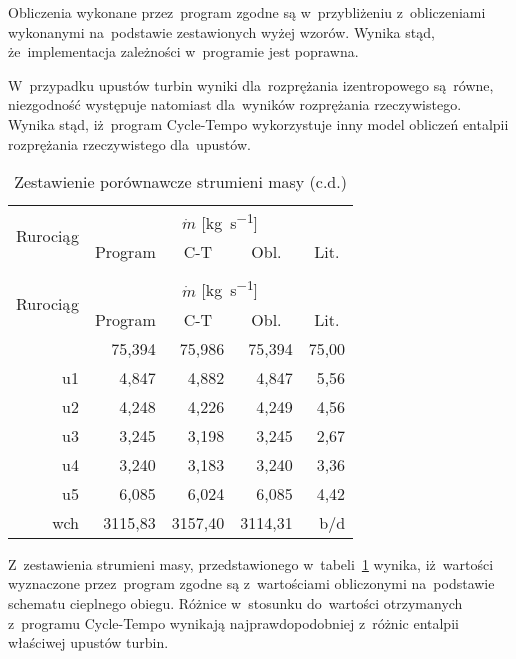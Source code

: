 Obliczenia wykonane przez~program zgodne są w~przybliżeniu
z~obliczeniami wykonanymi na~podstawie zestawionych wyżej wzorów.
Wynika stąd, że~implementacja zależności w~programie jest poprawna.

W~przypadku upustów turbin wyniki dla~rozprężania izentropowego
są~równe, niezgodność występuje natomiast dla~wyników rozprężania
rzeczywistego. Wynika stąd, iż~program Cycle-Tempo wykorzystuje inny
model obliczeń entalpii rozprężania rzeczywistego dla~upustów.

\begin{longtable}{|*{5}{r|}}
	\caption{Zestawienie porównawcze strumieni masy}
	\label{test-wyniki3} \\

	\hline
		\multirow{2}{*}{Rurociąg} &
		\multicolumn{4}{c|}{$\dot m$ [\si{\kilogram\per\second}]} \\
	\cline{2-5}
		&
		\multicolumn{1}{c|}{Program} &
		\multicolumn{1}{c|}{C-T} &
		\multicolumn{1}{c|}{Obl.} &
		\multicolumn{1}{c|}{Lit.} \\
	\hline
	\endfirsthead
	\caption{Zestawienie porównawcze strumieni masy (c.d.)} \\

	\hline
		\multirow{2}{*}{Rurociąg} &
		\multicolumn{4}{c|}{$\dot m$ [\si{\kilogram\per\second}]} \\
	\cline{2-5}
		&
		\multicolumn{1}{c|}{Program} &
		\multicolumn{1}{c|}{C-T} &
		\multicolumn{1}{c|}{Obl.} &
		\multicolumn{1}{c|}{Lit.} \\
	\hline
	\endhead
	\hline
	\endfoot
		 1 & 75,394 & 75,986 & 75,394 & 75,00 \\
		u1 &  4,847 &  4,882 &  4,847 &  5,56 \\
		u2 &  4,248 &  4,226 &  4,249 &  4,56 \\
		u3 &  3,245 &  3,198 &  3,245 &  2,67 \\
		u4 &  3,240 &  3,183 &  3,240 &  3,36 \\
		u5 &  6,085 &  6,024 &  6,085 &  4,42 \\
		wch & 3115,83 & 3157,40 & 3114,31 & b/d \\
\end{longtable}

Z~zestawienia strumieni masy, przedstawionego
w~tabeli~\ref{test-wyniki3} wynika, iż~wartości wyznaczone przez~program
zgodne są z~wartościami obliczonymi na~podstawie schematu cieplnego
obiegu. Różnice w~stosunku do~wartości otrzymanych z~programu
Cycle-Tempo wynikają najprawdopodobniej z~różnic entalpii właściwej
upustów turbin.

